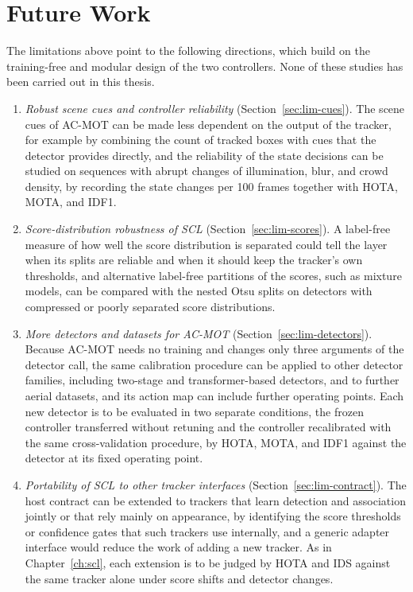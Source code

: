 \section{Future Work}\label{sec:conc-future}
The limitations above point to the following directions, which build on the training-free and modular design of the two controllers. None of these studies has been carried out in this thesis.
\begin{enumerate}
\item \emph{Robust scene cues and controller reliability} (Section~\ref{sec:lim-cues}). The scene cues of AC-MOT can be made less dependent on the output of the tracker, for example by combining the count of tracked boxes with cues that the detector provides directly, and the reliability of the state decisions can be studied on sequences with abrupt changes of illumination, blur, and crowd density, by recording the state changes per 100 frames together with HOTA, MOTA, and IDF1.
\item \emph{Score-distribution robustness of SCL} (Section~\ref{sec:lim-scores}). A label-free measure of how well the score distribution is separated could tell the layer when its splits are reliable and when it should keep the tracker's own thresholds, and alternative label-free partitions of the scores, such as mixture models, can be compared with the nested Otsu splits on detectors with compressed or poorly separated score distributions.
\item \emph{More detectors and datasets for AC-MOT} (Section~\ref{sec:lim-detectors}). Because AC-MOT needs no training and changes only three arguments of the detector call, the same calibration procedure can be applied to other detector families, including two-stage and transformer-based detectors, and to further aerial datasets, and its action map can include further operating points. Each new detector is to be evaluated in two separate conditions, the frozen controller transferred without retuning and the controller recalibrated with the same cross-validation procedure, by HOTA, MOTA, and IDF1 against the detector at its fixed operating point.
\item \emph{Portability of SCL to other tracker interfaces} (Section~\ref{sec:lim-contract}). The host contract can be extended to trackers that learn detection and association jointly or that rely mainly on appearance, by identifying the score thresholds or confidence gates that such trackers use internally, and a generic adapter interface would reduce the work of adding a new tracker. As in Chapter~\ref{ch:scl}, each extension is to be judged by HOTA and IDS against the same tracker alone under score shifts and detector changes.

\end{enumerate}
